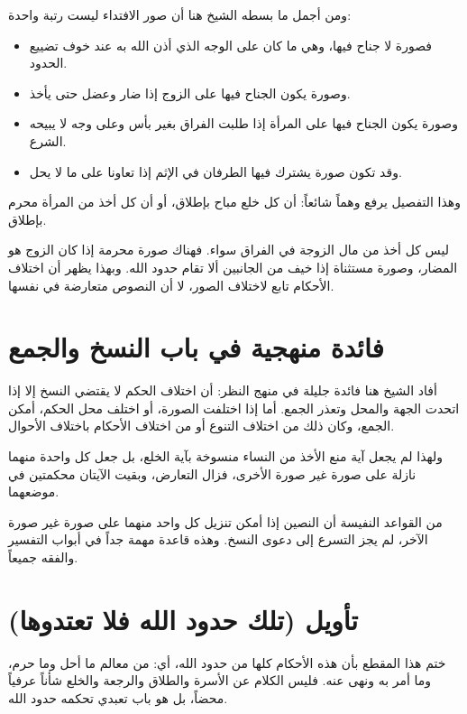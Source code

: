ومن أجمل ما بسطه الشيخ هنا أن صور الافتداء ليست رتبة واحدة:
\begin{itemize}
    \item فصورة لا جناح فيها، وهي ما كان على الوجه الذي أذن الله به عند خوف تضييع الحدود.
    \item وصورة يكون الجناح فيها على الزوج إذا ضار وعضل حتى يأخذ.
    \item وصورة يكون الجناح فيها على المرأة إذا طلبت الفراق بغير بأس وعلى وجه لا يبيحه الشرع.
    \item وقد تكون صورة يشترك فيها الطرفان في الإثم إذا تعاونا على ما لا يحل.
\end{itemize}
وهذا التفصيل يرفع وهماً شائعاً: أن كل خلع مباح بإطلاق، أو أن كل أخذ من المرأة محرم بإطلاق.

\begin{fawaid}
ليس كل أخذ من مال الزوجة في الفراق سواء. فهناك صورة محرمة إذا كان الزوج هو المضار، وصورة مستثناة إذا خيف من الجانبين ألا تقام حدود الله. وبهذا يظهر أن اختلاف الأحكام تابع لاختلاف الصور، لا أن النصوص متعارضة في نفسها.
\end{fawaid}

\section{فائدة منهجية في باب النسخ والجمع}
أفاد الشيخ هنا فائدة جليلة في منهج النظر: أن اختلاف الحكم لا يقتضي النسخ إلا إذا اتحدت الجهة والمحل وتعذر الجمع. أما إذا اختلفت الصورة، أو اختلف محل الحكم، أمكن الجمع، وكان ذلك من اختلاف التنوع أو من اختلاف الأحكام باختلاف الأحوال.

ولهذا لم يجعل  آية منع الأخذ من النساء منسوخة بآية الخلع، بل جعل كل واحدة منهما نازلة على صورة غير صورة الأخرى، فزال التعارض، وبقيت الآيتان محكمتين في موضعهما.

\begin{fawaid}
من القواعد النفيسة أن النصين إذا أمكن تنزيل كل واحد منهما على صورة غير صورة الآخر، لم يجز التسرع إلى دعوى النسخ. وهذه قاعدة مهمة جداً في أبواب التفسير والفقه جميعاً.
\end{fawaid}

\separator

\section{تأويل (تلك حدود الله فلا تعتدوها)}
ختم  هذا المقطع بأن هذه الأحكام كلها من حدود الله، أي: من معالم ما أحل وما حرم، وما أمر به ونهى عنه. فليس الكلام عن الأسرة والطلاق والرجعة والخلع شأناً عرفياً محضاً، بل هو باب تعبدي تحكمه حدود الله.

